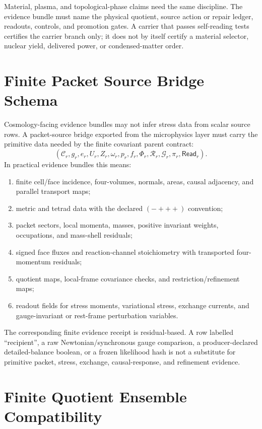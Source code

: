 \documentclass[11pt]{article}
\theoremstyle{remark}
\theoremstyle{plain}
\begin{document}
Material, plasma, and topological-phase claims need the same discipline. The evidence bundle must
name the physical quotient, source action or repair ledger, readouts, controls, and promotion
gates. A carrier that passes self-reading tests certifies the carrier branch only; it does not by
itself certify a material selector, nuclear yield, delivered power, or condensed-matter order.

\section{Finite Packet Source Bridge Schema}

Cosmology-facing evidence bundles may not infer stress data from scalar source rows. A packet-source
bridge exported from the microphysics layer must carry the primitive data needed by the finite
covariant parent contract:
\[
(\mathcal C_r,g_r,e_r,U_r,Z_r,\omega_r,p_r,f_r,\Phi_r,\mathcal R_r,\mathcal G_r,\pi_r,\mathsf{Read}_r).
\]
In practical evidence bundles this means:
\begin{enumerate}
\item finite cell/face incidence, four-volumes, normals, areas, causal adjacency, and parallel
transport maps;
\item metric and tetrad data with the declared \((-+++)\) convention;
\item packet sectors, local momenta, masses, positive invariant weights, occupations, and mass-shell
residuals;
\item signed face fluxes and reaction-channel stoichiometry with transported four-momentum
residuals;
\item quotient maps, local-frame covariance checks, and restriction/refinement maps;
\item readout fields for stress moments, variational stress, exchange currents, and gauge-invariant
or rest-frame perturbation variables.
\end{enumerate}

The corresponding finite evidence receipt is residual-based. A row labelled ``recipient'', a raw
Newtonian/synchronous gauge comparison, a producer-declared detailed-balance boolean, or a frozen
likelihood hash is not a substitute for primitive packet, stress, exchange, causal-response, and
refinement evidence.

\section{Finite Quotient Ensemble Compatibility}
\end{document}
